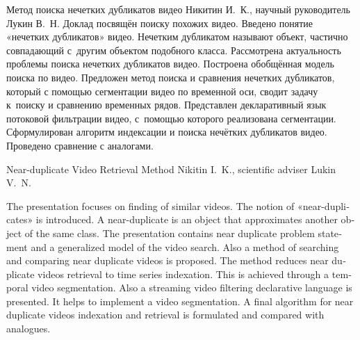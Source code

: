 \documentclass{.local/lib/classes/ndvr-super-article-standalone}
\begin{document}
    \begin{titlepage}
        \begin{annotation-item}%
            {Метод поиска нечетких дубликатов видео}
            {Никитин И. К., научный руководитель Лукин В. Н.}
            Доклад посвящён поиску похожих видео. 
            Введено понятие «нечетких дубликатов» видео. 
            Нечетким дубликатом называют объект, 
            частично совпадающий 
            с~другим объектом подобного класса. 
            Рассмотрена актуальность проблемы 
            поиска нечетких дубликатов видео. 
            Построена обобщённая модель поиска по видео. 
            Предложен метод поиска и сравнения нечетких дубликатов, 
            который с помощью сегментации видео по временной оси, 
            сводит задачу к поиску и сравнению временных рядов. 
            Представлен декларативный язык потоковой фильтрации видео, 
            с~помощью которого реализована сегментации. 
            Сформулирован алгоритм индексации 
            и поиска нечётких дубликатов видео. 
            Проведено сравнение с аналогами.
        \end{annotation-item}

        \begin{annotation-item}%
            {Near-duplicate Video Retrieval Method}
            {Nikitin I. K., scientific adviser Lukin V. N.}
            \begin{english}
                The presentation focuses 
                on finding of similar videos. 
                The notion of «near-duplicates» is introduced. 
                A near-duplicate is an object that approximates 
                another object of the same class. 
                The presentation contains 
                near duplicate problem statement 
                and a generalized model of the video search. 
                Also a method of searching and comparing 
                near duplicate videos is proposed.  
                The method reduces near duplicate videos retrieval 
                to time series indexation. 
                This is achieved through a temporal video segmentation. 
                Also a streaming video filtering 
                declarative language is presented. 
                It helps to implement a video segmentation. 
                A final algorithm for near duplicate videos 
                indexation and retrieval is formulated 
                and compared with analogues.
            \end{english}

        \end{annotation-item}
    \end{titlepage}
    \newpage
\end{document}
